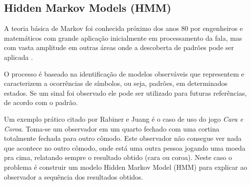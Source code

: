
\subsection{Hidden Markov Models (HMM)}
\label{tecnica-hmm}

A teoria básica de Markov foi conhecida próximo dos anos 80 por engenheiros e matemáticos com grande aplicação inicialmente em processamento da fala, mas com vasta amplitude em outras áreas onde a descoberta de padrões pode ser aplicada \cite{Rabiner-HMM}.

O processo é baseado na identificação de modelos observáveis que representem e caracterizem a ocorrências de símbolos, ou seja, padrões, em determinados estados. Se um sinal foi observado ele pode ser utilizado para futuras referências, de acordo com o padrão. 

Um exemplo prático citado por Rabiner e Juang \cite{Rabiner-HMM} é o caso de uso do jogo  \textit{Cara e Coroa}. Toma-se um observador em um quarto fechado com uma cortina totalmente fechada para outro cômodo. Este observador não consegue ver nada que acontece no outro cômodo, onde está uma outra pessoa jogando uma moeda pra cima, relatando sempre o resultado obtido (cara ou coroa). Neste caso o problema é construir um modelo Hidden Markov Model (HMM) para explicar ao observador a sequência dos resultados obtidos. 

